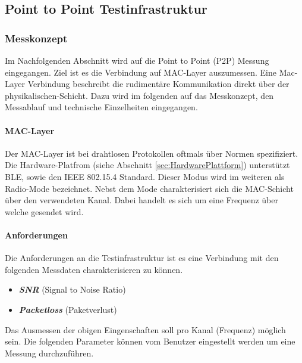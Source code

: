 \vspace*{4cm}
\begin{center}
\part{Point to Point Testinfrastruktur}\label{PointtoPointTestinfrastruktur}
\end{center}
\vspace*{\fill}
\clearpage

\section{Messkonzept}\label{sec:KonzeptP2PMessung}

Im Nachfolgenden Abschnitt wird auf die Point to Point (P2P) Messung eingegangen. Ziel ist es die Verbindung auf MAC-Layer auszumessen. Eine Mac-Layer Verbindung beschreibt die rudimentäre Kommunikation direkt über der physikalischen-Schicht. Dazu wird im folgenden auf das Messkonzept, den Messablauf und technische Einzelheiten eingegangen. 

\subsection{MAC-Layer}\label{sec:MAC-LayerP2P}

Der MAC-Layer ist bei drahtlosen Protokollen oftmals über Normen spezifiziert. Die Hardware-Platfrom (siehe Abschnitt \ref{sec:HardwarePlattform}) unterstützt BLE, sowie den IEEE 802.15.4 Standard. Dieser Modus wird im weiteren als Radio-Mode bezeichnet. Nebst dem Mode charakterisiert sich die MAC-Schicht über den verwendeten Kanal. Dabei handelt es sich um eine Frequenz über welche gesendet wird. 

\subsection{Anforderungen}\label{sec:AnforderungentP2P}

Die Anforderungen an die Testinfrastruktur ist es eine Verbindung mit den folgenden Messdaten charakterisieren zu können. 

\begin{itemize}
	\item \textit{\textbf{SNR}} (Signal to Noise Ratio)
	\item \textit{\textbf{Packetloss}} (Paketverlust)
\end{itemize}

Das Ausmessen der obigen Eingenschaften soll pro Kanal (Frequenz) möglich sein. Die folgenden Parameter können vom Benutzer eingestellt werden um eine Messung durchzuführen.

